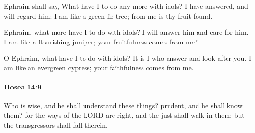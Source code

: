 			\begin{versebox}
					\item[BHS] 
					\item[LXX] 
					\item[ASV] Ephraim shall say, What have I to do any more with idols? I have answered, and will regard him: I am like a green fir-tree; from me is thy fruit found.
					\item[NIV] Ephraim, what more have I to do with idols? I will answer him and care for him. I am like a flourishing juniper; your fruitfulness comes from me.”
					\item[NRSV] O Ephraim, what have I to do with idols? It is I who answer and look after you. I am like an evergreen cypress; your faithfulness comes from me.
			\end{versebox}

		\paragraph{Hosea 14:9} %
			\label{HOSEA-14-9}

			Who is wise, and he shall understand these things? prudent, and he shall know them? for the ways of the LORD are right, and the just shall walk in them: but the transgressors shall fall therein.

